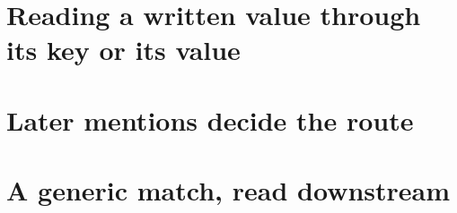 \section{Reading a written value through its key or its value}\label{sec:setup}        %

\section{Later mentions decide the route}\label{sec:claim1}                              %

\section{A generic match, read downstream}\label{sec:claim2}                             %

